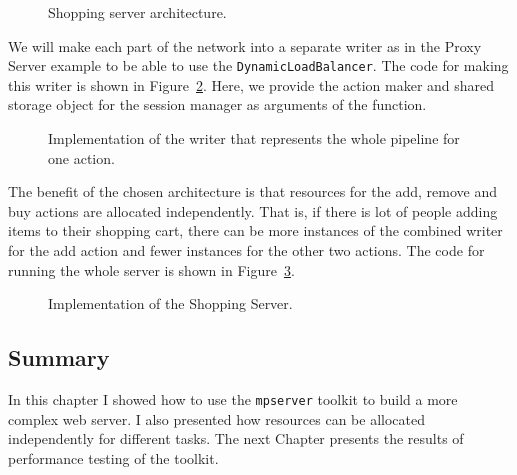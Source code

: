 \begin{figure}[h]
\caption[scale=1.0]{Shopping server architecture.}
\label{fig:shoppingDesign}
\end{figure}

We will make each part of the network into a separate writer as in
the Proxy Server example to be able to use the \texttt{DynamicLoadBalancer}.
The code for making this writer is shown in Figure~\ref{fig:shoppingWriter}.
Here, we provide the action maker and shared storage object for the session manager 
as arguments of the function.

\begin{figure}[h]
 
\caption[scale=1.0]{Implementation of the writer that represents the whole
pipeline for one action.}
\label{fig:shoppingWriter}
\end{figure}

The benefit of the chosen architecture is that resources for the add, remove
and buy actions are allocated independently. That is, if there is lot of 
people adding items to their shopping cart, there can be more instances
of the combined writer for the add action and fewer instances for the
other two actions. The code for running the whole server is shown
in Figure~\ref{fig:ShoppingCode}.

\begin{figure}
 
\caption[scale=1.0]{Implementation of the Shopping Server.}
\label{fig:ShoppingCode}
\end{figure}

\subsection{Summary}
In this chapter I showed how to use the \texttt{mpserver} toolkit
to build a more complex web server. I also presented how resources can
be allocated independently for different tasks. The next Chapter 
presents the results of performance testing of the toolkit.


